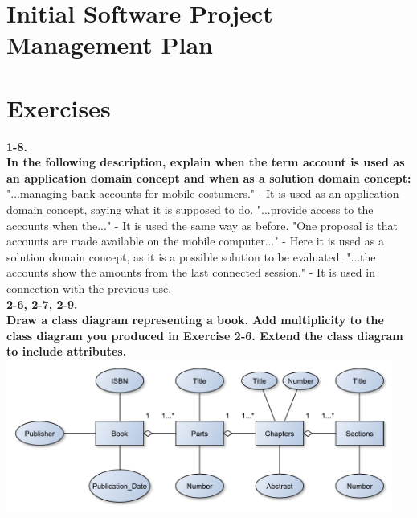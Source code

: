 \documentclass[12pt]{article}
\begin{document}
\newpage
\section{Initial Software Project Management Plan}










\newpage
\section{Exercises}
\textbf{1-8.}\\
\textbf{In the following description, explain when the term account is used as an application domain concept and when as a solution domain concept:}\\
"...managing bank accounts for mobile costumers." - It is used as an application domain concept, saying what it is supposed to do. 
"...provide access to the accounts when the..." - It is used the same way as before. 
"One proposal is that accounts are made available on the mobile computer..." - Here it is used as a solution domain concept, as it is a possible solution to be evaluated. 
"...the accounts show the amounts from the last connected session." - It is used in connection with the previous use.\\











\newpage
\textbf{2-6, 2-7, 2-9.}\\
\textbf{Draw a class diagram representing a book. Add multiplicity to the class diagram you produced in Exercise 2-6. Extend the class diagram to include attributes.}\\

\includegraphics[height=50mm]{2-6}\\
\end{document}
